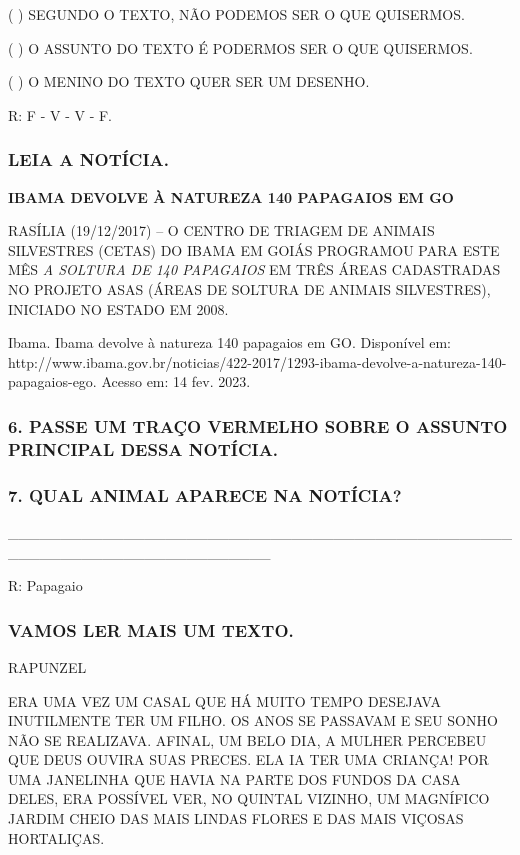 ( ) SEGUNDO O TEXTO, NÃO PODEMOS SER O QUE QUISERMOS.

( ) O ASSUNTO DO TEXTO É PODERMOS SER O QUE QUISERMOS.

( ) O MENINO DO TEXTO QUER SER UM DESENHO.

R: F - V - V - F.

\subsubsection{LEIA A NOTÍCIA.}\label{leia-a-notuxedcia.}

\textbf{IBAMA DEVOLVE À NATUREZA 140 PAPAGAIOS EM GO}

RASÍLIA (19/12/2017) -- O CENTRO DE TRIAGEM DE ANIMAIS SILVESTRES
(CETAS) DO IBAMA EM GOIÁS PROGRAMOU PARA ESTE MÊS \emph{A SOLTURA DE 140
PAPAGAIOS} EM TRÊS ÁREAS CADASTRADAS NO PROJETO ASAS (ÁREAS DE SOLTURA
DE ANIMAIS SILVESTRES), INICIADO NO ESTADO EM 2008.~

Ibama. Ibama devolve à natureza 140 papagaios em GO. Disponível
em: http://www.ibama.gov.br/noticias/422-2017/1293-ibama-devolve-a-natureza-140-papagaios-ego. Acesso em: 14 fev. 2023.

\subsubsection{6. PASSE UM TRAÇO VERMELHO SOBRE O ASSUNTO PRINCIPAL
DESSA NOTÍCIA.}\label{passe-um-trauxe7o-com-luxe1pis-vermelho-o-assunto-principal-dessa-notuxedcia.}

\subsubsection{7. QUAL ANIMAL APARECE NA
NOTÍCIA?}\label{qual-animal-aparece-na-notuxedcia}

\_\_\_\_\_\_\_\_\_\_\_\_\_\_\_\_\_\_\_\_\_\_\_\_\_\_\_\_\_\_\_\_\_\_\_\_\_\_\_\_\_\_\_\_\_\_\_\_\_\_\_\_\_\_\_\_\_\_\_\_\_\_\_\_\_\_\_\_\_\_\_\_\_

R: Papagaio

\subsubsection{VAMOS LER MAIS UM TEXTO.}\label{vamos-ler-mais-um-texto.}

RAPUNZEL

ERA UMA VEZ UM CASAL QUE HÁ MUITO TEMPO DESEJAVA INUTILMENTE TER UM
FILHO. OS ANOS SE PASSAVAM E SEU SONHO NÃO SE REALIZAVA. AFINAL, UM
BELO DIA, A MULHER PERCEBEU QUE DEUS OUVIRA SUAS PRECES. ELA IA TER UMA
CRIANÇA! POR UMA JANELINHA QUE HAVIA NA PARTE DOS FUNDOS DA CASA DELES,
ERA POSSÍVEL VER, NO QUINTAL VIZINHO, UM MAGNÍFICO JARDIM CHEIO DAS MAIS
LINDAS FLORES E DAS MAIS VIÇOSAS HORTALIÇAS.

